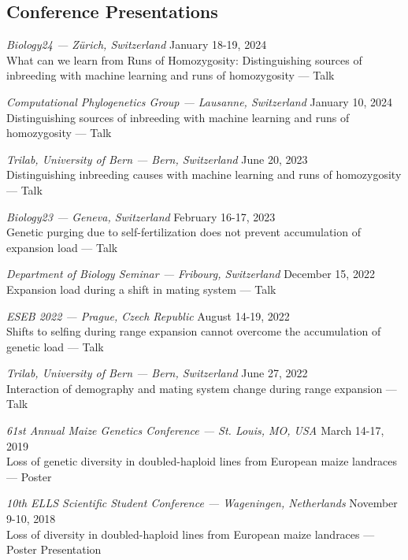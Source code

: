 \documentclass[margin,a4paper]{res}
\begin{document}
\begin{resume}

\section{Conference Presentations} %

{\sl{Biology24 --- Zürich, Switzerland}} \hfill January 18-19, 2024\\
What can we learn from Runs of Homozygosity: Distinguishing sources of inbreeding with machine learning and runs of homozygosity --- Talk

{\sl{Computational Phylogenetics Group --- Lausanne, Switzerland}} \hfill January 10, 2024\\
Distinguishing sources of inbreeding with machine learning and runs of homozygosity --- Talk

{\sl{Trilab, University of Bern --- Bern, Switzerland}} \hfill June 20, 2023\\
Distinguishing inbreeding causes with machine learning and runs of homozygosity --- Talk

{\sl{Biology23 --- Geneva, Switzerland}} \hfill February 16-17, 2023\\
Genetic purging due to self-fertilization does not prevent accumulation of expansion load --- Talk

{\sl{Department of Biology Seminar --- Fribourg, Switzerland}} \hfill December 15, 2022\\
Expansion load during a shift in mating system --- Talk

{\sl{ESEB 2022 --- Prague, Czech Republic}} \hfill August 14-19, 2022\\
Shifts to selfing during range expansion cannot overcome the accumulation of genetic load --- Talk

{\sl{Trilab, University of Bern --- Bern, Switzerland}} \hfill June 27, 2022\\
Interaction of demography and mating system change during range expansion --- Talk

{\sl{61st Annual Maize Genetics Conference --- St. Louis, MO, USA }} \hfill March 14-17, 2019\\
Loss of genetic diversity in doubled-haploid lines from European maize landraces --- Poster

{\sl{10th ELLS Scientific Student Conference --- Wageningen, Netherlands}} \hfill November 9-10, 2018\\
Loss of diversity in doubled-haploid lines from European maize landraces --- Poster Presentation


\end{resume}
\end{document}
